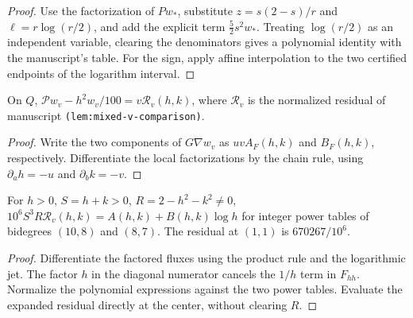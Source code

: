 \begin{proof}
\leanok
{}
Use the factorization of $Pw_*$, substitute $z=s(2-s)/r$ and
$\ell=r\log(r/2)$, and add the explicit term $\tfrac52s^2w_*$. Treating
$\log(r/2)$ as an independent variable, clearing the denominators gives a
polynomial identity with the manuscript's table.
For the sign, apply affine interpolation to the two certified endpoints of
the logarithm interval.
\end{proof}

\begin{lemma}
\label{lem:mixed-v-residual-identity}
\leanok
On $Q$, $\mathcal Pw_v-h^2w_v/100=v\mathcal R_v(h,k)$, where
$\mathcal R_v$ is the normalized residual of manuscript
\texttt{(lem:mixed-v-comparison)}.
\end{lemma}

\begin{proof}
\leanok
Write the two components of $G\nabla w_v$ as $uvA_F(h,k)$ and $B_F(h,k)$,
respectively. Differentiate the local factorizations by the chain rule,
using $\partial_a h=-u$ and $\partial_b k=-v$.
\end{proof}

\begin{lemma}
\label{lem:mixed-odd-b-clear}
\leanok
For $h>0$, $S=h+k>0$, $R=2-h^2-k^2\ne0$,
$10^6 S^3R\mathcal R_v(h,k)=A(h,k)+B(h,k)\log h$ for integer power tables
of bidegrees $(10,8)$ and $(8,7)$. The residual at $(1,1)$ is $670267/10^6$.
\end{lemma}

\begin{proof}
\leanok
Differentiate the factored fluxes using the product rule and the logarithmic jet.
The factor $h$ in the diagonal numerator cancels the $1/h$ term in $F_{hh}$.
Normalize the polynomial expressions against the two power tables.
Evaluate the expanded residual directly at the center, without clearing $R$.
\end{proof}

